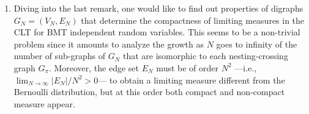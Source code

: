 \documentclass[a4paper,12pt]{extarticle}
\theoremstyle{definition}
\theoremstyle{remark}
\begin{document}
\begin{enumerate}[(1)]
\item  Diving into the last remark, one would like to find out properties of digraphs $G_N=(V_N,E_N)$ that determine the compactness of limiting measures in the CLT for BMT independent random variables. 
%
This seems to be a non-trivial problem since it amounts to analyze the growth as $N$ goes to infinity of the number of sub-graphs of $G_N$ that are isomorphic to each nesting-crossing graph $G_\pi$. 
%
Moreover, the edge set $E_N$ must be of order $N^2$ ---i.e., $\lim_{N \to \infty} |E_N|/N^2 > 0$--- to obtain a limiting measure different from the Bernoulli distribution, but at this order both compact and non-compact measure appear. 

\end{enumerate}

\end{document}
